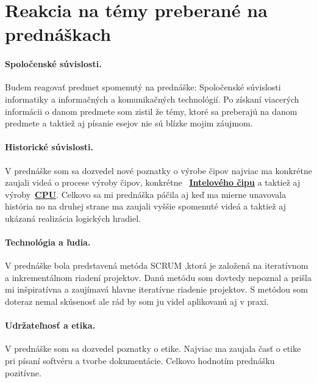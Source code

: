 \section{Reakcia na témy preberané na prednáškach} \label{reakcie_na_prednasky}

\paragraph{Spoločenské súvislosti.}
Budem reagovať predmet spomenutý na prednáške: Spoločenské súvislosti informatiky a informačných
a komunikačných technológií. Po získaní viacerých informácii o danom predmete som zistil že témy,
ktoré sa preberajú na danom predmete a taktiež aj písanie esejov nie sú blízke mojim záujmom. 


\paragraph{Historické súvislosti.}
V prednáške som sa dozvedel nové poznatky o výrobe čipov najviac ma konkrétne zaujali
videá o procese výroby čipov, konkrétne ~\textbf{\href{https://www.youtube.com/watch?v=u-dmL9ec26Q}{Intelového čipu}} a taktiež aj 
výroby~\textbf{\href{https://www.youtube.com/watch?v=vK-geBYygXo}{CPU}}.
Celkovo sa mi prednáška páčila aj keď ma mierne unavovala história no na druhej strane 
ma zaujali vyššie spomenuté videá a taktiež aj ukázaná realizácia logických hradiel.  

\paragraph{Technológia a ľudia.}
V prednáške bola predstavená metóda SCRUM ,ktorá je založená na iteratívnom
a inkrementálnom riadení projektov. Danú metódu som dovtedy nepoznal a prišla mi
inšpiratívna a zaujímavá hlavne iteratívne riadenie projektov. S metódou som doteraz nemal
skúsenosť ale rád by som ju videl aplikovanú aj v praxi.   

\paragraph{Udržateľnosť a etika.}
V prednáške som sa dozvedel poznatky o etike. Najviac ma zaujala časť o etike pri písaní 
softvéru a tvorbe dokumentácie. Celkovo hodnotím prednášku pozitívne.
